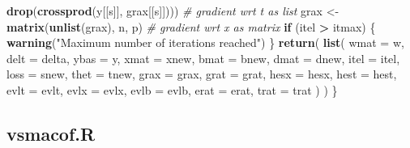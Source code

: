\documentclass[
  12pt,
]{article}
\newenvironment{Shaded}{\begin{snugshade}}{\end{snugshade}}
\newcommand{\AttributeTok}[1]{\textcolor[rgb]{0.13,0.29,0.53}{#1}}
\newcommand{\CommentTok}[1]{\textcolor[rgb]{0.56,0.35,0.01}{\textit{#1}}}
\newcommand{\ControlFlowTok}[1]{\textcolor[rgb]{0.13,0.29,0.53}{\textbf{#1}}}
\newcommand{\FunctionTok}[1]{\textcolor[rgb]{0.13,0.29,0.53}{\textbf{#1}}}
\newcommand{\NormalTok}[1]{#1}
\newcommand{\OtherTok}[1]{\textcolor[rgb]{0.56,0.35,0.01}{#1}}
\newcommand{\SpecialCharTok}[1]{\textcolor[rgb]{0.81,0.36,0.00}{\textbf{#1}}}
\newcommand{\StringTok}[1]{\textcolor[rgb]{0.31,0.60,0.02}{#1}}
\begin{document}
\begin{Shaded}
\begin{Highlighting}[]
        \FunctionTok{drop}\NormalTok{(}\FunctionTok{crossprod}\NormalTok{(y[[s]], grax[[s]]))) }\CommentTok{\# gradient wrt t as list}
\NormalTok{    grax }\OtherTok{\textless{}{-}} \FunctionTok{matrix}\NormalTok{(}\FunctionTok{unlist}\NormalTok{(grax), n, p) }\CommentTok{\# gradient wrt x as matrix}
    \ControlFlowTok{if}\NormalTok{ (itel }\SpecialCharTok{\textgreater{}}\NormalTok{ itmax) \{}
      \FunctionTok{warning}\NormalTok{(}\StringTok{"Maximum number of iterations reached"}\NormalTok{)}
\NormalTok{    \}}
    \FunctionTok{return}\NormalTok{(}
      \FunctionTok{list}\NormalTok{(}
        \AttributeTok{wmat =}\NormalTok{ w,}
        \AttributeTok{delt =}\NormalTok{ delta,}
        \AttributeTok{ybas =}\NormalTok{ y,}
        \AttributeTok{xmat =}\NormalTok{ xnew,}
        \AttributeTok{bmat =}\NormalTok{ bnew,}
        \AttributeTok{dmat =}\NormalTok{ dnew,}
        \AttributeTok{itel =}\NormalTok{ itel,}
        \AttributeTok{loss =}\NormalTok{ snew,}
        \AttributeTok{thet =}\NormalTok{ tnew,}
        \AttributeTok{grax =}\NormalTok{ grax,}
        \AttributeTok{grat =}\NormalTok{ grat,}
        \AttributeTok{hesx =}\NormalTok{ hesx,}
        \AttributeTok{hest =}\NormalTok{ hest,}
        \AttributeTok{evlt =}\NormalTok{ evlt,}
        \AttributeTok{evlx =}\NormalTok{ evlx,}
        \AttributeTok{evlb =}\NormalTok{ evlb,}
        \AttributeTok{erat =}\NormalTok{ erat,}
        \AttributeTok{trat =}\NormalTok{ trat}
\NormalTok{      )}
\NormalTok{    )}
\NormalTok{  \}}
\end{Highlighting}
\end{Shaded}

\subsection{vsmacof.R}\label{vsmacof.r}
\end{document}
